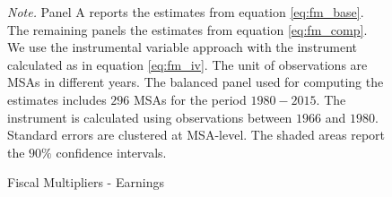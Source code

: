 \documentclass[dv_diss_main.tex]{subfiles}
\begin{document}
\begin{figure}[H]
\begin{center}
\begin{tabular}[c]{ccc}
    
    
    \end{tabular}
    \end{center}
    
    \caption{Fiscal Multipliers - Earnings}
 
    \footnotesize{\textit{Note. } Panel A reports the estimates from equation \eqref{eq:fm_base}. The remaining panels the estimates from equation \eqref{eq:fm_comp}. We use the instrumental variable approach with the instrument calculated as in equation \eqref{eq:fm_iv}. The unit of observations are MSAs in different years. The balanced panel used for computing the estimates includes $296$ MSAs for the period $1980-2015$. The instrument is calculated using observations between $1966$ and $1980$. Standard errors are clustered at MSA-level. The shaded areas report the $90\%$ confidence intervals.}

    \label{fig:fm_earnings}
\end{figure}
\newpage
\end{document}
